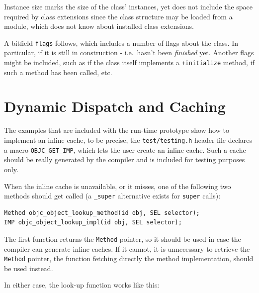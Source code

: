 Instance size marks the size of the class' instances, yet does not include the space required by class extensions since the class structure may be loaded from a module, which does not know about installed class extensions.

A bitfield \verb=flags= follows, which includes a number of flags about the class. In particular, if it is still in construction - i.e.\ hasn't been \emph{finished} yet. Another flags might be included, such as if the class itself implements a \verb=+initialize= method, if such a method has been called, etc.

\section{Dynamic Dispatch and Caching}

The examples that are included with the run-time prototype show how to implement an inline cache, to be precise, the \verb=test/testing.h= header file declares a macro \verb=OBJC_GET_IMP=, which lets the user create an inline cache. Such a cache should be really generated by the compiler and is included for testing purposes only.

When the inline cache is unavailable, or it misses, one of the following two methods should get called (a \verb=_super= alternative exists for \verb=super= calls):

\begin{verbatim}
Method objc_object_lookup_method(id obj, SEL selector);
IMP objc_object_lookup_impl(id obj, SEL selector);
\end{verbatim}

The first function returns the \verb=Method= pointer, so it should be used in case the compiler can generate inline caches. If it cannot, it is unnecessary to retrieve the \verb=Method= pointer, the function fetching directly the method implementation, should be used instead.

In either case, the look-up function works like this:

